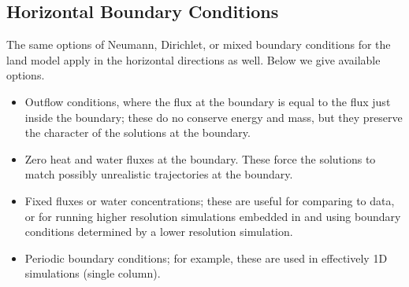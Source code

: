 \documentclass[twoside,10pt]{report}
\begin{document}
\subsection{Horizontal Boundary Conditions}
The same options of Neumann, Dirichlet, or mixed boundary conditions for the land model apply in the horizontal directions as well. Below we give available options.
\begin{itemize}
    \item Outflow conditions, where the flux at the boundary is equal to the flux just inside the boundary; these do no conserve energy and mass, but they preserve the character of the solutions at the boundary.
    \item Zero heat and water fluxes at the boundary. These force the solutions to match possibly unrealistic trajectories at the boundary.
    \item Fixed fluxes or water concentrations; these are useful for comparing to data, or for running higher resolution simulations embedded in and using boundary conditions determined by a lower resolution simulation. 
    \item Periodic boundary conditions; for example, these are used in effectively 1D simulations (single column).

\end{itemize}




\end{document}
